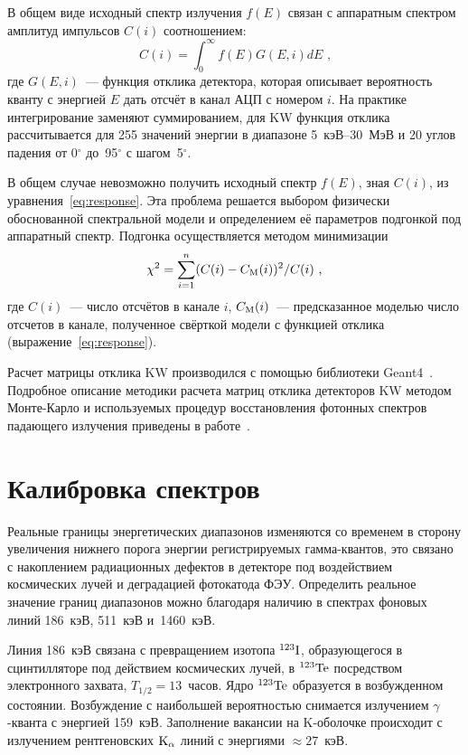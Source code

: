 В общем виде исходный спектр излучения $f(E)$ связан с аппаратным спектром амплитуд 
импульсов $C(i)$ соотношением:
\begin{equation}\label{eq:response}
    C(i)=\int_{0}^{\infty} f(E)G(E,i) dE \mbox{ ,}
\end{equation}
где $G(E,i)$~--- функция отклика детектора, которая описывает вероятность кванту 
с энергией $E$ дать отсчёт в канал АЦП с номером $i$. На практике интегрирование 
заменяют суммированием, для KW функция отклика рассчитывается для 255 
значений энергии в диапазоне 5~кэВ--30~МэВ и 20 углов падения 
от 0$^\circ$ до~95$^\circ$ с шагом~5$^\circ$.

В общем случае невозможно получить исходный спектр $f(E)$, зная $C(i)$, из 
уравнения~\ref{eq:response}.  Эта проблема решается выбором физически обоснованной 
спектральной модели и определением её параметров подгонкой под аппаратный спектр. 
Подгонка осуществляется методом минимизации
\begin{equation}\label{eq:chisq}
    \chi^2=\sum\limits_{i=1}^n(C(i)-C_{\mathrm{M}}(i))^2/C(i) \mbox{ ,}
\end{equation}
где $C(i)$~--- число отсчётов в канале $i$, $C_{\mathrm{M}}(i)$~--- предсказанное моделью число отсчетов в канале, 
полученное свёрткой модели с функцией отклика (выражение~\ref{eq:response}).

Расчет матрицы отклика KW производился с помощью библиотеки Geant4~\citep{GEANT4_2003NIMPA}.
Подробное описание методики расчета матриц отклика детекторов KW методом Монте-Карло 
и используемых процедур восстановления фотонных спектров падающего излучения 
приведены в работе~\citep{Terekhov_1998AIPC}.

\section{Калибровка спектров}
Реальные границы энергетических диапазонов изменяются со временем в сторону 
увеличения нижнего порога энергии регистрируемых гамма-квантов, это  
связано с накоплением радиационных дефектов в детекторе под воздействием 
космических лучей и деградацией фотокатода ФЭУ. Определить реальное значение 
границ диапазонов можно благодаря наличию в спектрах фоновых линий 186~кэВ, 511~кэВ и~1460~кэВ.

Линия 186~кэВ связана с превращением изотопа $^{123}{\mathrm{I}}$, образующегося в 
сцинтилляторе под действием космических лучей, в $^{123}{\mathrm{Te}}$ посредством 
электронного захвата, $T_{1/2}=13$~часов. Ядро $^{123}{\mathrm{Te}}$ образуется в 
возбужденном состоянии. Возбуждение с наибольшей вероятностью снимается излучением $\gamma$-кванта 
с энергией 159~кэВ. Заполнение вакансии на K-оболочке происходит с излучением 
рентгеновских ${\mathrm{K}}_{\alpha}$ линий с энергиями $\approx 27$~кэВ.

